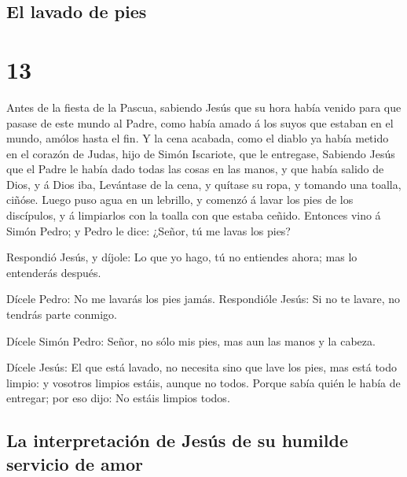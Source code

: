 \hypertarget{el-lavado-de-pies}{%
\subsection{El lavado de pies}\label{el-lavado-de-pies}}

\hypertarget{section-12}{%
\section{13}\label{section-12}}

 Antes de la fiesta de la Pascua, sabiendo Jesús que su hora
había venido para que pasase de este mundo al Padre, como había amado á
los suyos que estaban en el mundo, amólos hasta el fin.  Y
la cena acabada, como el diablo ya había metido en el corazón de Judas,
hijo de Simón Iscariote, que le entregase,  Sabiendo Jesús
que el Padre le había dado todas las cosas en las manos, y que había
salido de Dios, y á Dios iba,  Levántase de la cena, y
quítase su ropa, y tomando una toalla, ciñóse.  Luego puso
agua en un lebrillo, y comenzó á lavar los pies de los discípulos, y á
limpiarlos con la toalla con que estaba ceñido.  Entonces
vino á Simón Pedro; y Pedro le dice: ¿Señor, tú me lavas los pies?

 Respondió Jesús, y díjole: Lo que yo hago, tú no entiendes
ahora; mas lo entenderás después.

 Dícele Pedro: No me lavarás los pies jamás. Respondióle
Jesús: Si no te lavare, no tendrás parte conmigo.

 Dícele Simón Pedro: Señor, no sólo mis pies, mas aun las
manos y la cabeza.

 Dícele Jesús: El que está lavado, no necesita sino que
lave los pies, mas está todo limpio: y vosotros limpios estáis, aunque
no todos.  Porque sabía quién le había de entregar; por eso
dijo: No estáis limpios todos.

\hypertarget{la-interpretaciuxf3n-de-jesuxfas-de-su-humilde-servicio-de-amor}{%
\subsection{La interpretación de Jesús de su humilde servicio de
amor}\label{la-interpretaciuxf3n-de-jesuxfas-de-su-humilde-servicio-de-amor}}

